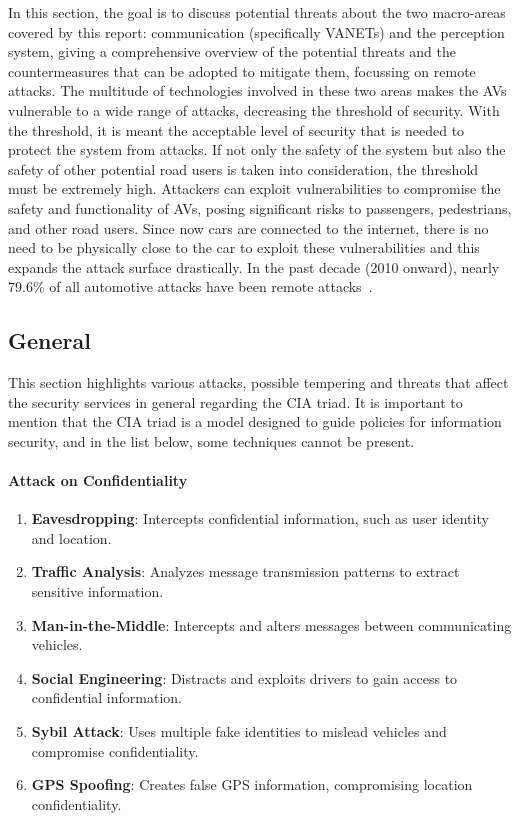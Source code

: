 In this section, the goal is to discuss potential threats about the two macro-areas covered by this report:
communication (specifically VANETs) and the perception system,
giving a comprehensive overview of the potential threats and the
countermeasures that can be adopted to mitigate them, focussing on remote attacks.
The multitude of technologies involved in these two areas makes the AVs vulnerable to a wide range of attacks,
decreasing the threshold of security.
With the threshold, it is meant the acceptable level of security that is needed to protect the system from attacks.
If not only the safety of the system but also the safety of other potential road users is taken into consideration,
the threshold must be extremely high.
Attackers can exploit vulnerabilities to compromise the safety and functionality of AVs,
posing significant risks to passengers, pedestrians, and other road users.
Since now cars are connected to the internet, there is no need to be physically close to the car to exploit these vulnerabilities and this expands the attack surface drastically.
In the past decade (2010 onward), nearly 79.6\% of all automotive attacks have been
remote attacks~\cite{cybersec}.

\subsection{General}\label{subsec:communication-system}

This section highlights various attacks, possible tempering and threats that affect the security services in general regarding
the CIA triad.
It is important to mention that the CIA triad is a model designed to guide policies for information security, and in the list below, some techniques cannot be present.

\paragraph{Attack on Confidentiality}
\begin{enumerate}
    \item \textbf{Eavesdropping}: Intercepts confidential information, such as user identity and location.
    \item \textbf{Traffic Analysis}: Analyzes message transmission patterns to extract sensitive information.
    \item \textbf{Man-in-the-Middle}: Intercepts and alters messages between communicating vehicles.
    \item \textbf{Social Engineering}: Distracts and exploits drivers to gain access to confidential information.
    \item \textbf{Sybil Attack}: Uses multiple fake identities to mislead vehicles and compromise confidentiality.
    \item \textbf{GPS Spoofing}: Creates false GPS information, compromising location confidentiality.
\end{enumerate}

